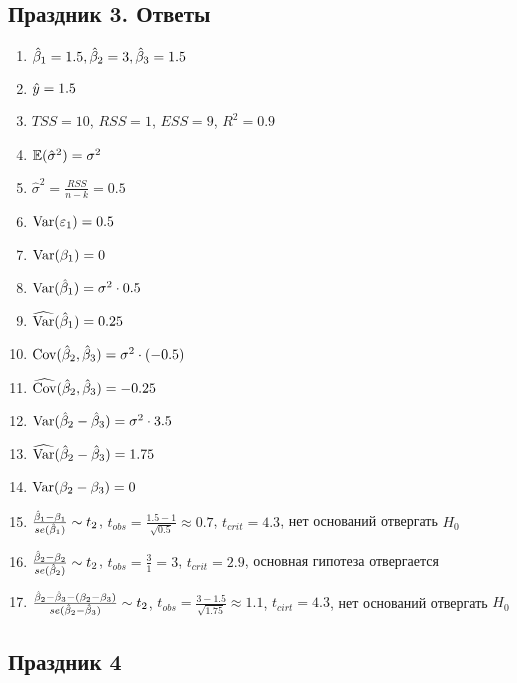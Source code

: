 \documentclass[12pt, a4paper]{article}
\theoremstyle{definition}
\begin{document}
\subsection{Праздник 3. Ответы}
\begin{enumerate}
\item $\hat{\beta}_1 = 1.5, \hat{\beta}_2 = 3, \hat{\beta}_3 = 1.5$
\item $\hat{y} = 1.5$
\item $TSS = 10$, $RSS = 1$, $ESS = 9$, $R^2 = 0.9$
\item $\operatorname{\mathbb{E}} (\hat{\sigma}^2) = \sigma^2$
\item $\hat{\sigma}^2 = \frac{RSS}{n-k} = 0.5$
\item $\operatorname{Var}(\varepsilon_1) = 0.5$
\item $\operatorname{Var} (\beta_1) = 0$
\item $\operatorname{Var} (\hat{\beta}_1) = \sigma^2 \cdot 0.5$
\item $\widehat{\operatorname{Var} }(\hat{\beta}_1) = 0.25$
\item $\operatorname{Cov} (\hat{\beta}_2, \hat{\beta}_3) = \sigma^2 \cdot (-0.5)$
\item $\widehat{\operatorname{Cov} }(\hat{\beta}_2, \hat{\beta}_3) = -0.25$
\item $\operatorname{Var} (\hat{\beta}_2 - \hat{\beta}_3) = \sigma^2 \cdot 3.5$
\item $\widehat{\operatorname{Var} }(\hat{\beta}_2 - \hat{\beta}_3) = 1.75$
\item $\operatorname{Var} (\beta_2 - \beta_3) = 0$
\item $\frac{\hat{\beta}_1 - \beta_1}{se(\hat{\beta}_1)} \sim t_2$, $t_{obs} = \frac{1.5-1}{\sqrt{0.5}} \approx 0.7$, $t_{crit} = 4.3$, нет оснований отвергать $H_0$
\item $\frac{\hat{\beta}_2 - \beta_2}{se(\hat{\beta}_2)} \sim t_2$, $t_{obs} = \frac{3}{1} = 3$, $t_{crit} = 2.9$, основная гипотеза отвергается
\item $\frac{\hat{\beta}_2 - \hat{\beta}_3 - (\beta_2 - \beta_3)}{se(\hat{\beta}_2 - \hat{\beta}_3)} \sim t_2$, $t_{obs} = \frac{3-1.5}{\sqrt{1.75}} \approx 1.1$, $t_{cirt} = 4.3$, нет оснований отвергать $H_0$
\end{enumerate}



\subsection{Праздник 4}
\end{document}
